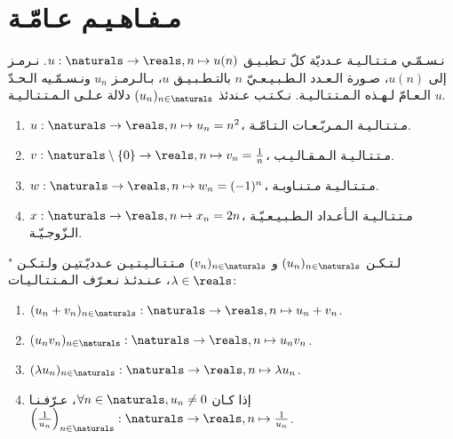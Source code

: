 \section{مـفـاهـيـم عـامّـة}%
\label{sec:sesequences:general-concepts}

\begin{definition}[الـمـتـتـالـيـة]%
    \label{def:sequences:sequence}
    نـسـمّـي مـتـتـالـيـة عـدديّة كلّ تـطبـيـق
    \(u:\naturals \to \reals, n \mapsto u(n)\).
    نـرمـز إلى \(u(n)\)، صـورة الـعـدد الـطـبـيـعـيّ \(n\)
    بالتـطـبـيـق \(u\)، بـالـرمـز \(u_n\)
    ونـسـمّـيه الـحـدّ الـعـامّ لـهـذه الـمـتـتـالـيـة.
    نـكـتـب عـندئذ \((u_n)_{n \in \naturals}\)
    دلالة عـلـى الـمـتـتـالـيـة \(u\).
\end{definition}

\begin{example}%
    \begin{enumerate}%
        \item \(u:\naturals \to \reals, n \mapsto u_n = n^2\)،
              مـتـتـالـيـة الـمـربّـعـات الـتـامّـة.
        \item \(v:\naturals \setminus \{0\} \to \reals, n \mapsto v_n = \frac{1}{n}\)،
              مـتـتـالـيـة الـمـقـالـيـب.
        \item \(w:\naturals \to \reals, n \mapsto w_n = (-1)^n\)،
              مـتـتـالـيـة مـتـنـاوبـة.
        \item \(x:\naturals \to \reals, n \mapsto x_n = 2n\)،
              مـتـتـالـيـة الـأعـداد الـطـبـيـعـيّـة الـزّوجـيّـة.
    \end{enumerate}
\end{example}

\begin{definition}"
    \label{def:sequences:operations}
    لـتـكـن \((u_n)_{n \in \naturals}\) و \((v_n)_{n \in \naturals}\) مـتـتـالـيـتـيـن عـدديّـتيـن
    ولـتـكـن \(\lambda \in \reals\)،
    عـنـدئـذ نـعـرّف الـمـتـتـالـيـات:
    \begin{enumerate}
        \item \((u_n + v_n)_{n \in \naturals}: \naturals \to \reals, n \mapsto u_n + v_n\).
        \item \((u_n v_n)_{n \in \naturals}: \naturals \to \reals, n \mapsto u_n v_n\).
        \item \((\lambda u_n)_{n \in \naturals}: \naturals \to \reals, n \mapsto \lambda u_n\).
        \item إذا كـان \(\forall n \in \naturals, u_n \neq 0\)، عـرّفـنـا
              \(\left(\frac{1}{u_{n}}\right)_{n\in\naturals}: \naturals \to \reals, n \mapsto \frac{1}{u_n}\).
    \end{enumerate}
\end{definition}

